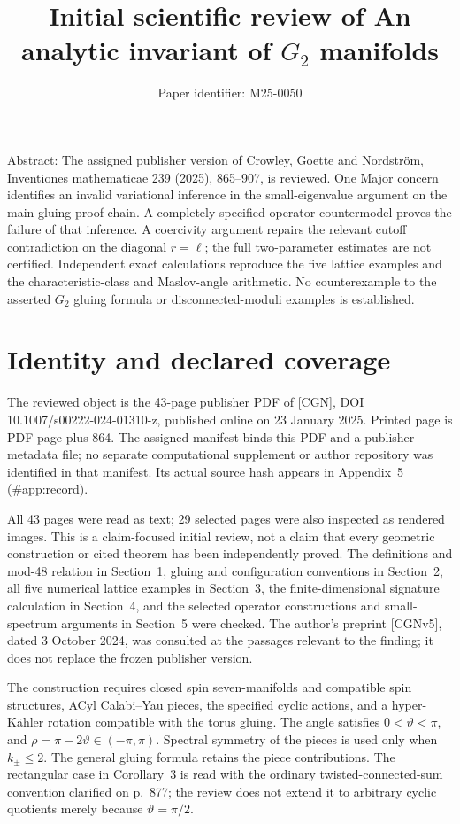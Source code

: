 \documentclass[10pt]{article}
\title{Initial scientific review of
An analytic invariant of \(G_2\) manifolds}
\author{Paper identifier: M25-0050}
\date{}
\begin{document}
\maketitle
Abstract: The assigned publisher version of Crowley, Goette and Nordström, Inventiones mathematicae 239 (2025), 865–907, is reviewed. One Major concern identifies an invalid variational inference in the small-eigenvalue argument on the main gluing proof chain. A completely specified operator countermodel proves the failure of that inference. A coercivity argument repairs the relevant cutoff contradiction on the diagonal \(r=\ell\); the full two-parameter estimates are not certified. Independent exact calculations reproduce the five lattice examples and the characteristic-class and Maslov-angle arithmetic. No counterexample to the asserted \(G_2\) gluing formula or disconnected-moduli examples is established.\par
\section*{Identity and declared coverage}
The reviewed object is the 43-page publisher PDF of [CGN], DOI 10.1007/s00222-024-01310-z, published online on 23 January 2025. Printed page is PDF page plus 864. The assigned manifest binds this PDF and a publisher metadata file; no separate computational supplement or author repository was identified in that manifest. Its actual source hash appears in Appendix 5 (\#app:record).\par
All 43 pages were read as text; 29 selected pages were also inspected as rendered images. This is a claim-focused initial review, not a claim that every geometric construction or cited theorem has been independently proved. The definitions and mod-48 relation in Section 1, gluing and configuration conventions in Section 2, all five numerical lattice examples in Section 3, the finite-dimensional signature calculation in Section 4, and the selected operator constructions and small-spectrum arguments in Section 5 were checked. The author’s preprint [CGNv5], dated 3 October 2024, was consulted at the passages relevant to the finding; it does not replace the frozen publisher version.\par
The construction requires closed spin seven-manifolds and compatible spin structures, ACyl Calabi–Yau pieces, the specified cyclic actions, and a hyper-Kähler rotation compatible with the torus gluing. The angle satisfies \(0<\vartheta<\pi\), and \(\rho=\pi-2\vartheta\in(-\pi,\pi)\). Spectral symmetry of the pieces is used only when \(k_\pm\leq2\). The general gluing formula retains the piece contributions. The rectangular case in Corollary 3 is read with the ordinary twisted-connected-sum convention clarified on p. 877; the review does not extend it to arbitrary cyclic quotients merely because \(\vartheta=\pi/2\).\par
\end{document}
